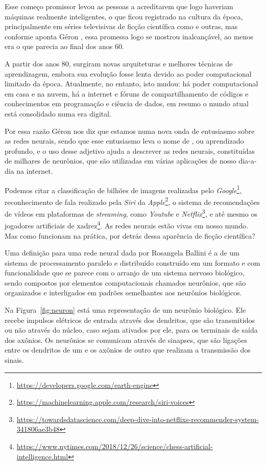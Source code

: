 Esse começo promissor levou as pessoas a acreditarem que logo haveriam máquinas realmente inteligentes, o que ficou registrado na cultura da época, principalmente em séries televisivas de ficção científica como  e outras, mas conforme aponta Géron \citep{hands}, essa promessa logo se mostrou inalcançável, ao menos era o que parecia ao final dos anos 60. 

A partir dos anos 80, surgiram novas arquiteturas e melhores técnicas de aprendizagem, embora sua evolução fosse lenta devido ao poder computacional limitado da época. Atualmente, no entanto, isto mudou: há poder computacional em casa e na nuvem, há a internet e fóruns de compartilhamento de códigos e conhecimentos em programação e ciência de dados, em resumo o mundo atual está consolidado numa era digital. 

Por essa razão Géron \citep{hands} nos diz que estamos numa nova onda de entusiasmo sobre as redes neurais, sendo que esse entusiasmo leva o nome de , ou aprendizado profundo, e o uso desse adjetivo ajuda a descrever as redes neurais, constituídas de milhares de neurônios, que são utilizadas em várias aplicações de nosso dia-a-dia na internet.

Podemos citar a classificação de bilhões de imagens realizadas pelo \emph{Google}\footnote{\url{https://developers.google.com/earth-engine}}, reconhecimento de fala realizado pela \emph{Siri} da \emph{Apple}\footnote{\url{https://machinelearning.apple.com/research/siri-voices}}, o sistema de recomendações de vídeos em plataformas de \emph{streaming}, como \emph{Youtube} e \emph{Netflix}\footnote{\url{https://towardsdatascience.com/deep-dive-into-netflixs-recommender-system-341806ae3b48}}, e até mesmo os jogadores artificiais de xadrez\footnote{\url{https://www.nytimes.com/2018/12/26/science/chess-artificial-intelligence.html}}. As redes neurais estão vivas em nosso mundo. Mas como funcionam na prática, por detrás dessa aparência de ficção científica?

Uma definição para uma rede neural dada por Rosangela Ballini \citep{doutorado} é a de um sistema de processamento paralelo e distribuído construído em um formato e com funcionalidade que se parece com o arranjo de um sistema nervoso biológico, sendo compostos por elementos computacionais chamados neurônios, que são organizados e interligados em padrões semelhantes aos neurônios biológicos.

Na Figura~\ref{fig:neuron} está uma representação de um neurônio biológico. Ele recebe impulsos elétricos de entrada através dos dendritos, que são transmitidos ou não através do núcleo, caso sejam ativados por ele, para os terminais de saída dos axônios. Os neurônios se comunicam através de sinapses, que são ligações entre os dendritos de um e os axônios de outro que realizam a transmissão dos sinais. 

